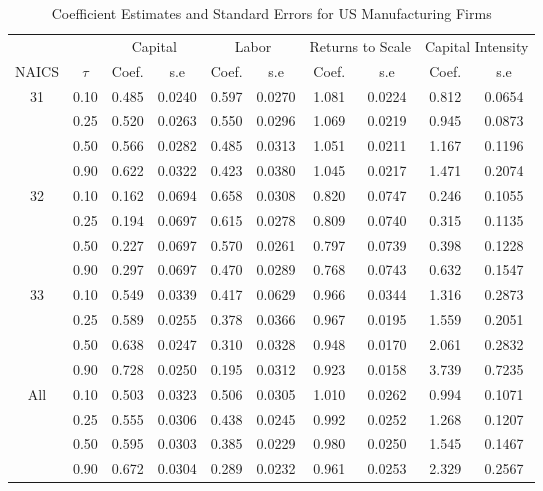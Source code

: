 \begin{table}[ht]
\centering
\caption{Coefficient Estimates and Standard Errors for US Manufacturing Firms} 
\begin{tabular}{cccccccccc}
  \hline\hline & & \multicolumn{2}{c}{Capital}  & \multicolumn{2}{c}{Labor} & \multicolumn{2}{c}{Returns to Scale} & \multicolumn{2}{c}{Capital Intensity}\\ \cmidrule(lr){3-4} \cmidrule(lr){5-6} \cmidrule(lr){7-8} \cmidrule(lr){9-10}NAICS & $\tau$ & Coef. & s.e & Coef. & s.e & Coef. & s.e & Coef. & s.e \\ 
  \hline
31 & 0.10 & 0.485 & 0.0240 & 0.597 & 0.0270 & 1.081 & 0.0224 & 0.812 & 0.0654 \\ 
   & 0.25 & 0.520 & 0.0263 & 0.550 & 0.0296 & 1.069 & 0.0219 & 0.945 & 0.0873 \\ 
   & 0.50 & 0.566 & 0.0282 & 0.485 & 0.0313 & 1.051 & 0.0211 & 1.167 & 0.1196 \\ 
   & 0.90 & 0.622 & 0.0322 & 0.423 & 0.0380 & 1.045 & 0.0217 & 1.471 & 0.2074 \\ 
  32 & 0.10 & 0.162 & 0.0694 & 0.658 & 0.0308 & 0.820 & 0.0747 & 0.246 & 0.1055 \\ 
   & 0.25 & 0.194 & 0.0697 & 0.615 & 0.0278 & 0.809 & 0.0740 & 0.315 & 0.1135 \\ 
   & 0.50 & 0.227 & 0.0697 & 0.570 & 0.0261 & 0.797 & 0.0739 & 0.398 & 0.1228 \\ 
   & 0.90 & 0.297 & 0.0697 & 0.470 & 0.0289 & 0.768 & 0.0743 & 0.632 & 0.1547 \\ 
  33 & 0.10 & 0.549 & 0.0339 & 0.417 & 0.0629 & 0.966 & 0.0344 & 1.316 & 0.2873 \\ 
   & 0.25 & 0.589 & 0.0255 & 0.378 & 0.0366 & 0.967 & 0.0195 & 1.559 & 0.2051 \\ 
   & 0.50 & 0.638 & 0.0247 & 0.310 & 0.0328 & 0.948 & 0.0170 & 2.061 & 0.2832 \\ 
   & 0.90 & 0.728 & 0.0250 & 0.195 & 0.0312 & 0.923 & 0.0158 & 3.739 & 0.7235 \\ 
  All & 0.10 & 0.503 & 0.0323 & 0.506 & 0.0305 & 1.010 & 0.0262 & 0.994 & 0.1071 \\ 
   & 0.25 & 0.555 & 0.0306 & 0.438 & 0.0245 & 0.992 & 0.0252 & 1.268 & 0.1207 \\ 
   & 0.50 & 0.595 & 0.0303 & 0.385 & 0.0229 & 0.980 & 0.0250 & 1.545 & 0.1467 \\ 
   & 0.90 & 0.672 & 0.0304 & 0.289 & 0.0232 & 0.961 & 0.0253 & 2.329 & 0.2567 \\ 
   \hline
\end{tabular}
\end{table}
